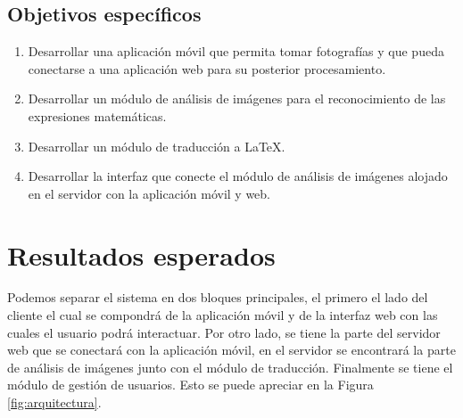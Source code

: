 \subsection{Objetivos específicos}
\begin{enumerate}
	\item Desarrollar una aplicación móvil que permita tomar fotografías y que pueda conectarse a una aplicación web para su posterior procesamiento.
	\item Desarrollar un módulo de análisis de imágenes para el reconocimiento de las expresiones matemáticas.
	\item Desarrollar un módulo de traducción a LaTeX.
	\item Desarrollar la interfaz que conecte el módulo de análisis de imágenes alojado en el servidor con la aplicación móvil y web.
\end{enumerate}


\section{Resultados esperados}
Podemos separar el sistema en dos bloques principales, el primero el lado del cliente el cual se compondrá de la aplicación móvil y de la interfaz web con las cuales el usuario podrá interactuar. Por otro lado, se tiene la parte del servidor web que se conectará con la aplicación móvil, en el servidor se encontrará la parte de análisis de imágenes junto con el módulo de traducción. Finalmente se tiene el módulo de gestión de usuarios. Esto se puede apreciar en la Figura \ref{fig:arquitectura}.%


